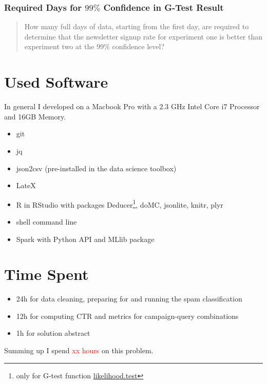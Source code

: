 \documentclass{article}\usepackage[]{graphicx}\usepackage[]{color}
\begin{document}
\subsubsection{Required Days for $99\%$ Confidence in G-Test Result} %
\label{subsub:days}

\begin{quote}
How many full days of data, starting from the first day, are required to determine that the newsletter signup rate for experiment one is better than experiment two at the 99\% confidence level?
\end{quote}








\section{Used Software}
\label{used_software}
In general I developed on a Macbook Pro with a 2.3 GHz Intel Core i7 Processor and 16GB Memory.

\begin{itemize}
	\item git
	\item jq
	\item json2csv (pre-installed in the data science toolbox)
	\item LateX
	\item R in RStudio with packages Deducer\footnote{only for G-test function \href{http://www.rforge.net/doc/packages/Deducer/likelihood.test.html}{likelihood.test}}, doMC, jsonlite, knitr, plyr 
	\item shell command line
	\item Spark with Python API and MLlib package
\end{itemize}

\section{Time Spent}
\begin{itemize}
	\item 24h for data cleaning, preparing for and running the spam classification
	\item 12h for computing CTR and metrics for campaign-query combinations
	\item 1h for solution abstract
\end{itemize}

Summing up I spend \textcolor{red}{xx hours} on this problem.
\end{document}
